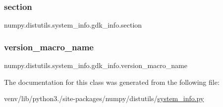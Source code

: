 \subsubsection{\texorpdfstring{section}{section}}
{\footnotesize\ttfamily numpy.\+distutils.\+system\+\_\+info.\+gdk\+\_\+info.\+section\hspace{0.3cm}{\ttfamily [static]}}

\mbox{\label{classnumpy_1_1distutils_1_1system__info_1_1gdk__info_affd5935aab0b240eaf3b961cfd9ebc97}} 
\subsubsection{\texorpdfstring{version\+\_\+macro\+\_\+name}{version\_macro\_name}}
{\footnotesize\ttfamily numpy.\+distutils.\+system\+\_\+info.\+gdk\+\_\+info.\+version\+\_\+macro\+\_\+name\hspace{0.3cm}{\ttfamily [static]}}



The documentation for this class was generated from the following file\+:\begin{DoxyCompactItemize}
\item 
venv/lib/python3./site-\/packages/numpy/distutils/\hyperlink{system__info_8py}{system\+\_\+info.\+py}\end{DoxyCompactItemize}
